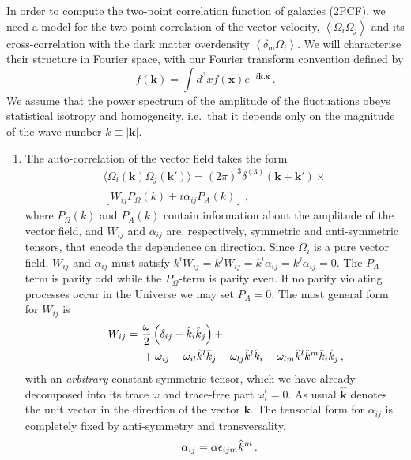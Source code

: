 \documentclass[a4paper,twocolumn,aps,prd,nolongbibliography,superscriptaddress,showpacs,showkeys,amsmath,amssymb,floatfix,nofootinbib]{revtex4-1}
\renewcommand{\[}{\begin{equation}}
\renewcommand{\]}{\end{equation}}
\newcommand{\corr}[1]{\left\langle #1 \right\rangle}
\newcommand{\ms}{\mathrm{m}}
\newcommand{\kb}{\boldsymbol{k}}
\newcommand{\xb}{\boldsymbol{x}}
\begin{document}
In order to compute the two-point correlation function of galaxies (2PCF), we need a model for the two-point correlation of the vector velocity, $\corr{\Omega_i\Omega_j}$ and its cross-correlation with the dark matter overdensity $\corr{\delta_\ms\Omega_i}$. We will characterise their structure in Fourier space, with our Fourier transform convention defined by
\[
f(\kb) = \int d^3 x f(\xb) e^{-i \kb . \xb} \, .
\]
We assume that the power spectrum of the amplitude of the fluctuations obeys statistical isotropy and homogeneity, i.e.\ that it depends only on the magnitude of the wave number $k\equiv |\mathbf{k}|$.

\begin{enumerate}
\item The auto-correlation of the vector field takes the form
\begin{align}
\langle\Omega_{i}(\kb)\Omega_{j}(\kb')\big\rangle = (2\pi)^{3}\delta^{(3)}(\kb+\kb')\times \nonumber\\
\left[W_{ij}P_{\Omega}(k) +i\alpha_{ij}P_A(k)\right] \,,
\end{align}
where $P_{\Omega}(k)$  and $P_A(k)$ contain information about the amplitude of the vector field, and $W_{ij}$ and $\alpha_{ij}$ are, respectively, symmetric and anti-symmetric tensors, that encode the dependence on direction.
Since $\Omega_i$ is a pure vector field, $W_{ij}$ and $\alpha_{ij}$ must satisfy $k^i W_{ij}=k^j W_{ij}=k^i\alpha_{ij}=k^j \alpha_{ij}=0$. 
The $P_A$-term is parity odd while the $P_\Omega$-term is parity even. If no parity violating processes occur in the Universe we may set $P_A=0$.
The most general form for $W_{ij}$ is 
\begin{align}
\hspace{0.7cm}W_{ij}=~&\frac{\omega}{2}\left(\delta_{ij}-\hat{k}_{i}\hat{k}_{j}\right)+ \label{eq:wij}\\
&+\bar{\omega}_{ij}-\bar{\omega}_{il}\hat{k}^{l}\hat{k}_{j}-\bar{\omega}_{lj}\hat{k}^{l}\hat{k}_{i}+
\bar{\omega}_{lm}\hat{k}^{l}\hat{k}^{m}\hat{k}_{i}\hat{k}_{j} \,,\nonumber
\end{align}
with an \emph{arbitrary} constant symmetric tensor, which we have already decomposed into its trace $\omega$ and trace-free part $\bar{\omega}^i_i=0$. 
As usual $\hat{\kb}$ denotes the unit vector in the direction of the vector $\kb$.
The  tensorial form for $\alpha_{ij}$ is completely fixed by anti-symmetry and transversality, 
\begin{equation}\label{eq:aij}
\hspace{0.3cm}\alpha_{ij}= \alpha\epsilon_{ijm}\hat k^m \,.
\end{equation}


\end{enumerate}
\end{document}
